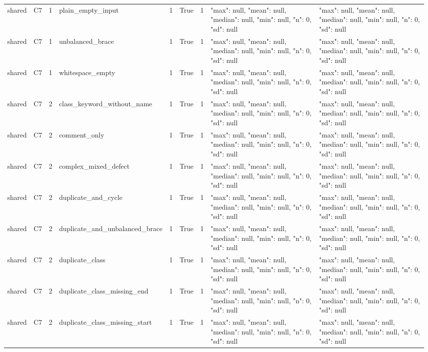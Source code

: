\begin{tabular}{lllllllll}
shared & C7 & 1 & plain\_empty\_input & 1 & True & 1 & {"max": null, "mean": null, "median": null, "min": null, "n": 0, "sd": null} & {"max": null, "mean": null, "median": null, "min": null, "n": 0, "sd": null} \\
shared & C7 & 1 & unbalanced\_brace & 1 & True & 1 & {"max": null, "mean": null, "median": null, "min": null, "n": 0, "sd": null} & {"max": null, "mean": null, "median": null, "min": null, "n": 0, "sd": null} \\
shared & C7 & 1 & whitespace\_empty & 1 & True & 1 & {"max": null, "mean": null, "median": null, "min": null, "n": 0, "sd": null} & {"max": null, "mean": null, "median": null, "min": null, "n": 0, "sd": null} \\
shared & C7 & 2 & class\_keyword\_without\_name & 1 & True & 1 & {"max": null, "mean": null, "median": null, "min": null, "n": 0, "sd": null} & {"max": null, "mean": null, "median": null, "min": null, "n": 0, "sd": null} \\
shared & C7 & 2 & comment\_only & 1 & True & 1 & {"max": null, "mean": null, "median": null, "min": null, "n": 0, "sd": null} & {"max": null, "mean": null, "median": null, "min": null, "n": 0, "sd": null} \\
shared & C7 & 2 & complex\_mixed\_defect & 1 & True & 1 & {"max": null, "mean": null, "median": null, "min": null, "n": 0, "sd": null} & {"max": null, "mean": null, "median": null, "min": null, "n": 0, "sd": null} \\
shared & C7 & 2 & duplicate\_and\_cycle & 1 & True & 1 & {"max": null, "mean": null, "median": null, "min": null, "n": 0, "sd": null} & {"max": null, "mean": null, "median": null, "min": null, "n": 0, "sd": null} \\
shared & C7 & 2 & duplicate\_and\_unbalanced\_brace & 1 & True & 1 & {"max": null, "mean": null, "median": null, "min": null, "n": 0, "sd": null} & {"max": null, "mean": null, "median": null, "min": null, "n": 0, "sd": null} \\
shared & C7 & 2 & duplicate\_class & 1 & True & 1 & {"max": null, "mean": null, "median": null, "min": null, "n": 0, "sd": null} & {"max": null, "mean": null, "median": null, "min": null, "n": 0, "sd": null} \\
shared & C7 & 2 & duplicate\_class\_missing\_end & 1 & True & 1 & {"max": null, "mean": null, "median": null, "min": null, "n": 0, "sd": null} & {"max": null, "mean": null, "median": null, "min": null, "n": 0, "sd": null} \\
shared & C7 & 2 & duplicate\_class\_missing\_start & 1 & True & 1 & {"max": null, "mean": null, "median": null, "min": null, "n": 0, "sd": null} & {"max": null, "mean": null, "median": null, "min": null, "n": 0, "sd": null} \\

\end{tabular}
